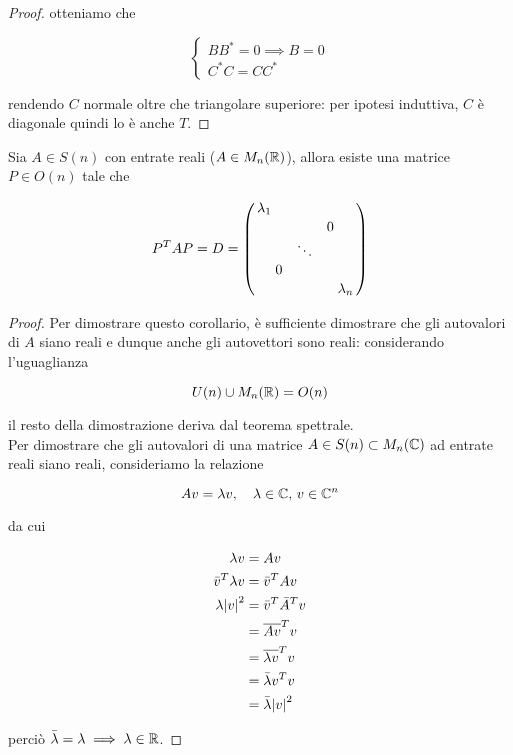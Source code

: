 \begin{proof}
	otteniamo che
	
	\begin{equation}
		\begin{cases}
			B B^{*} = 0 \implies B = 0\\
			C^{*} C = C C^{*}
		\end{cases}
	\end{equation}

	rendendo $ C $ normale oltre che triangolare superiore: per ipotesi induttiva, $ C $ è diagonale quindi lo è anche $ T $.
\end{proof}

\begin{corollary}
	Sia $ A \in S(n) $ con entrate reali ($ A \in M_{n}(\mathbb{R}) $), allora esiste una matrice $ P \in O(n) $ tale che
	
	\begin{equation}
		P^{T} A P = D = %
		\smqty(\dmat{\lambda_{1}, & & 0 \\ & \ddots & \\ 0 & & ,\lambda_{n}})
	\end{equation}
\end{corollary}

\begin{proof}
	Per dimostrare questo corollario, è sufficiente dimostrare che gli autovalori di $ A $ siano reali e dunque anche gli autovettori sono reali: considerando l'uguaglianza
	
	\begin{equation}
		U(n) \cup M_{n}(\mathbb{R}) = O(n)
	\end{equation}

	il resto della dimostrazione deriva dal teorema spettrale.\\
	Per dimostrare che gli autovalori di una matrice $ A \in S(n) \subset M_{n}(\mathbb{C}) $  ad entrate reali siano reali, consideriamo la relazione
	
	\begin{equation}
		A v = \lambda v \qcomma \lambda \in \C, \, v \in \C^{n}
	\end{equation}

	da cui

	\begin{align}
		\begin{split}
			\lambda v &= A v\\
			\bar{v}^{T} \lambda v &= \bar{v}^{T} A v\\
			\lambda \abs{v}^{2} &= \bar{v}^{T} \bar{A}^{T} v\\
			&= \overline{A v}^{T} v\\
			&= \overline{\lambda v}^{T} v\\
			&= \bar{\lambda} v^{T} v\\
			&= \bar{\lambda} \abs{v}^{2}
		\end{split}
	\end{align}

	perciò $ \bar{\lambda} = \lambda \implies \lambda \in \mathbb{R} $.
\end{proof}

